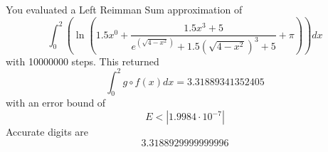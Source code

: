 \documentclass{article}
\begin{document}
You evaluated a Left Reimman Sum approximation of $$\int_{0}^{2}\left(\ln{\left(1.5x^{0}+\frac{1.5x^3 + 5}{e^{\left(\sqrt{4-x^2}\right)}+1.5\left(\sqrt{4-x^2}\right)^3 + 5}+\pi\right)}\right)dx$$ with 10000000 steps.
This returned$$\int_{0}^{2}g\circ f(x)dx=3.31889341352405$$ with an error bound of $$E<|1.9984\cdot 10^{-7}|$$Accurate digits are $$3.3188929999999996$$
\end{document}
